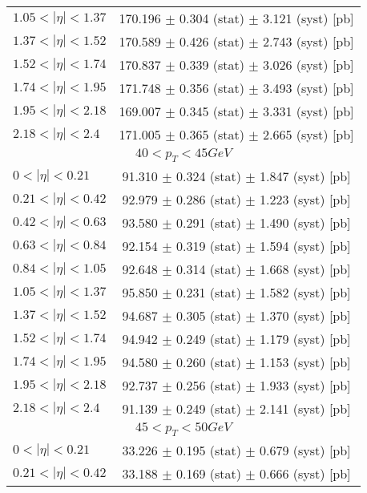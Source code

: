 \begin{tabular}{lc}
$1.05 < |\eta| <1.37$          & 170.196 $\pm$ 0.304 (stat) $\pm$ 3.121 (syst) [pb]  \\
$1.37 < |\eta| <1.52$          & 170.589 $\pm$ 0.426 (stat) $\pm$ 2.743 (syst) [pb]  \\
$1.52 < |\eta| <1.74$          & 170.837 $\pm$ 0.339 (stat) $\pm$ 3.026 (syst) [pb]  \\
$1.74 < |\eta| <1.95$          & 171.748 $\pm$ 0.356 (stat) $\pm$ 3.493 (syst) [pb]  \\
$1.95 < |\eta| <2.18$          & 169.007 $\pm$ 0.345 (stat) $\pm$ 3.331 (syst) [pb]  \\
$2.18 < |\eta| <2.4$           & 171.005 $\pm$ 0.365 (stat) $\pm$ 2.665 (syst) [pb]  \\
\hline
\multicolumn{2}{c}{$40 < p_{T} < 45 GeV$} \\
\hline
$0 < |\eta| <0.21$             & 91.310 $\pm$ 0.324 (stat) $\pm$ 1.847 (syst) [pb]  \\
$0.21 < |\eta| <0.42$          & 92.979 $\pm$ 0.286 (stat) $\pm$ 1.223 (syst) [pb]  \\
$0.42 < |\eta| <0.63$          & 93.580 $\pm$ 0.291 (stat) $\pm$ 1.490 (syst) [pb]  \\
$0.63 < |\eta| <0.84$          & 92.154 $\pm$ 0.319 (stat) $\pm$ 1.594 (syst) [pb]  \\
$0.84 < |\eta| <1.05$          & 92.648 $\pm$ 0.314 (stat) $\pm$ 1.668 (syst) [pb]  \\
$1.05 < |\eta| <1.37$          & 95.850 $\pm$ 0.231 (stat) $\pm$ 1.582 (syst) [pb]  \\
$1.37 < |\eta| <1.52$          & 94.687 $\pm$ 0.305 (stat) $\pm$ 1.370 (syst) [pb]  \\
$1.52 < |\eta| <1.74$          & 94.942 $\pm$ 0.249 (stat) $\pm$ 1.179 (syst) [pb]  \\
$1.74 < |\eta| <1.95$          & 94.580 $\pm$ 0.260 (stat) $\pm$ 1.153 (syst) [pb]  \\
$1.95 < |\eta| <2.18$          & 92.737 $\pm$ 0.256 (stat) $\pm$ 1.933 (syst) [pb]  \\
$2.18 < |\eta| <2.4$           & 91.139 $\pm$ 0.249 (stat) $\pm$ 2.141 (syst) [pb]  \\
\hline
\multicolumn{2}{c}{$45 < p_{T} < 50 GeV$} \\
\hline
$0 < |\eta| <0.21$             & 33.226 $\pm$ 0.195 (stat) $\pm$ 0.679 (syst) [pb]  \\
$0.21 < |\eta| <0.42$          & 33.188 $\pm$ 0.169 (stat) $\pm$ 0.666 (syst) [pb]  \\

\end{tabular}
